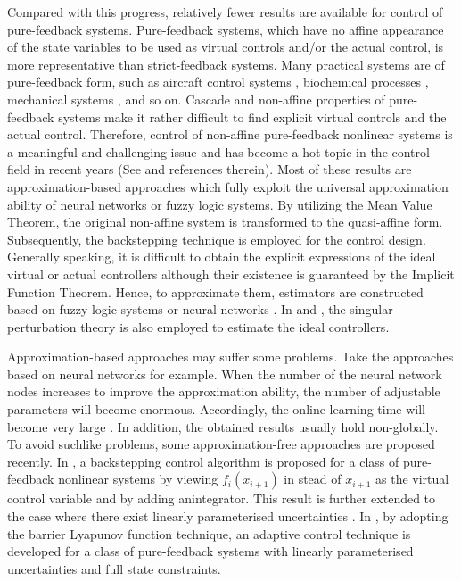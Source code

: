\documentclass{tSYS2e}
\theoremstyle{plain}
\theoremstyle{definition}
\begin{document}
Compared with this progress, relatively fewer results are available for control
of pure-feedback systems. Pure-feedback systems, which have no
affine appearance of the state variables to be used as virtual controls
and/or the actual control, is more representative than
strict-feedback systems. Many practical systems are of pure-feedback form,
such as aircraft control systems \citep{Hunt1997}, biochemical processes \citep
{Krstic1995}, mechanical systems \citep{Ferrara2000}, and so on. Cascade and non-affine
properties of pure-feedback systems make it rather difficult to find
explicit virtual controls and the actual control. Therefore, control of
non-affine pure-feedback nonlinear systems is a meaningful and challenging
issue and has become a hot topic in the control field in recent
years (See \cite{Liu2016, Tong2016} and references therein). Most of these
results are approximation-based approaches which fully exploit the universal
approximation ability of neural networks or fuzzy logic systems.
By utilizing the Mean Value Theorem, the original non-affine
system is transformed to the quasi-affine form. Subsequently, the
backstepping technique is employed for the control design. Generally speaking,
it is difficult to obtain the explicit expressions of the ideal
virtual or actual controllers although their existence is guaranteed by the
Implicit Function Theorem. Hence, to approximate them,
estimators are constructed based on fuzzy logic systems \citep{Gao2013,
Li2015, Yu2013, Zhang2010} or  neural networks \citep{Shen2014, Sun2013,
Wang2006, Wang2011, Wang2013}. In \cite{Yoo2012} and \cite{Gao2012}, the singular perturbation
theory is also employed to estimate the ideal controllers.

Approximation-based approaches may suffer some problems. Take the approaches based on neural networks for example.
When the number of the neural network nodes increases to improve the approximation ability,
the number of adjustable parameters will become enormous. Accordingly, the online learning time will become very large \citep{Tong2016}.
In addition, the obtained results usually hold non-globally. To avoid suchlike problems, some approximation-free approaches are proposed
recently. In \cite{Liu2014}, a backstepping control algorithm is proposed
for a class of pure-feedback nonlinear systems by viewing $f_{i}(\bar{x}_{i+1})$ in stead of
$x_{i+1}$ as the virtual control variable and by adding anintegrator.
This result is further extended to the case where there exist linearly parameterised uncertainties \citep{Liu2016}.
In \cite{Tong2016}, by adopting the barrier Lyapunov function technique,
an adaptive control technique is developed for a class of pure-feedback
systems with linearly parameterised uncertainties and full state constraints.
\end{document}
